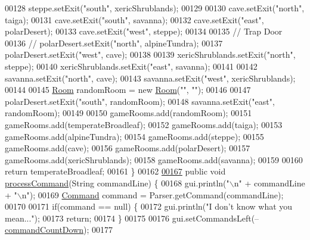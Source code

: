 \begin{DoxyCode}
00128         steppe.setExit(\textcolor{stringliteral}{"south"}, xericShrublands);
00129 
00130         cave.setExit(\textcolor{stringliteral}{"north"}, taiga);
00131         cave.setExit(\textcolor{stringliteral}{"south"}, savanna);
00132         cave.setExit(\textcolor{stringliteral}{"east"}, polarDesert);
00133         cave.setExit(\textcolor{stringliteral}{"west"}, steppe);
00134 
00135         \textcolor{comment}{// Trap Door}
00136         \textcolor{comment}{// polarDesert.setExit("north", alpineTundra);}
00137         polarDesert.setExit(\textcolor{stringliteral}{"west"}, cave);
00138 
00139         xericShrublands.setExit(\textcolor{stringliteral}{"north"}, steppe);
00140         xericShrublands.setExit(\textcolor{stringliteral}{"east"}, savanna);
00141 
00142         savanna.setExit(\textcolor{stringliteral}{"north"}, cave);
00143         savanna.setExit(\textcolor{stringliteral}{"west"}, xericShrublands);
00144 
00145         \hyperlink{classRoom}{Room} randomRoom = \textcolor{keyword}{new} \hyperlink{classRoom}{Room}(\textcolor{stringliteral}{""}, \textcolor{stringliteral}{""});
00146 
00147         polarDesert.setExit(\textcolor{stringliteral}{"south"}, randomRoom);
00148         savanna.setExit(\textcolor{stringliteral}{"east"}, randomRoom);
00149 
00150         gameRooms.add(randomRoom);
00151         gameRooms.add(temperateBroadleaf);
00152         gameRooms.add(taiga);
00153         gameRooms.add(alpineTundra);
00154         gameRooms.add(steppe);
00155         gameRooms.add(cave);
00156         gameRooms.add(polarDesert);
00157         gameRooms.add(xericShrublands);
00158         gameRooms.add(savanna);
00159 
00160         \textcolor{keywordflow}{return} temperateBroadleaf;
00161     \}
00162 
\hypertarget{GameEngine_8java_source_l00167}{}\hyperlink{classGameEngine_ad7133885f313fa99bca3bb7cb8272f64}{00167}     \textcolor{keyword}{public} \textcolor{keywordtype}{void} \hyperlink{classGameEngine_ad7133885f313fa99bca3bb7cb8272f64}{processCommand}(String commandLine) \{
00168         gui.println(\textcolor{stringliteral}{"\(\backslash\)n"} + commandLine + \textcolor{stringliteral}{"\(\backslash\)n"});
00169         \hyperlink{classCommand}{Command} command = Parser.getCommand(commandLine);
00170 
00171         \textcolor{keywordflow}{if}(command == null) \{
00172             gui.println(\textcolor{stringliteral}{"I don't know what you mean..."});
00173             \textcolor{keywordflow}{return};
00174         \}
00175 
00176         gui.setCommandsLeft(--\hyperlink{classGameEngine_ad4ff8d760eced9c7b76cdeb0dc989975}{commandCountDown});
00177 

\end{DoxyCode}
